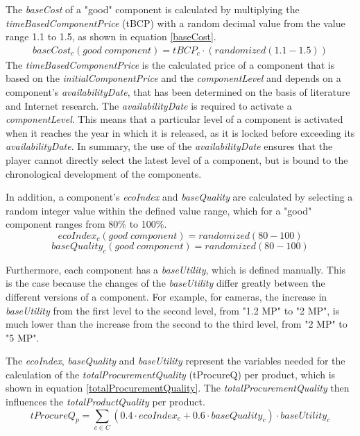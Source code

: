 The \textit{baseCost} of a "good" component is calculated by multiplying the \textit{timeBasedComponentPrice} (\gls{tBCP}) with a random decimal value from the value range 1.1 to 1.5, as shown in equation \ref{baseCost}.
\begin{equation}
\label{baseCost}
\begin{aligned}
   baseCost_{c}(good \; component) = tBCP_{c} \cdot (randomized(1.1-1.5))
\end{aligned}    
\end{equation}
The \textit{timeBasedComponentPrice} is the calculated price of a component that is based on the \textit{initialComponentPrice} and the \textit{componentLevel} and depends on a component's \textit{availabilityDate}, that has been determined on the basis of literature and Internet research. The \textit{availabilityDate} is required to activate a \textit{componentLevel}. This means that a particular level of a component is activated when it reaches the year in which it is released, as it is locked before exceeding its \textit{availabilityDate}. In summary, the use of the \textit{availabilityDate} ensures that the player cannot directly select the latest level of a component, but is bound to the chronological development of the components.

In addition, a component's \textit{ecoIndex} and \textit{baseQuality} are calculated by selecting a random integer value within the defined value range, which for a "good" component ranges from 80\% to 100\%.
\begin{equation}
    ecoIndex_{c}(good \; component) = randomized(80-100)
\end{equation}
\begin{equation}
    baseQuality_{c}(good \; component) = randomized(80-100)
\end{equation}

Furthermore, each component has a \textit{baseUtility}, which is defined manually. This is the case because the changes of the \textit{baseUtility} differ greatly between the different versions of a component. For example, for cameras, the increase in \textit{baseUtility} from the first level to the second level, from "1.2 MP" to "2 MP", is much lower than the increase from the second to the third level, from "2 MP" to "5 MP". 

The \textit{ecoIndex}, \textit{baseQuality} and \textit{baseUtility} represent the variables needed for the calculation of the \textit{totalProcurementQuality} (\gls{tProcureQ}) per product, which is shown in equation \ref{totalProcurementQuality}. The \textit{totalProcurementQuality} then influences the \textit{totalProductQuality} per product.
\begin{equation}
\label{totalProcurementQuality}
    tProcureQ_{p}= \sum_{c \in C} (0.4 \cdot ecoIndex_{c} + 0.6 \cdot baseQuality_{c}) \cdot baseUtility_{c}
\end{equation}

